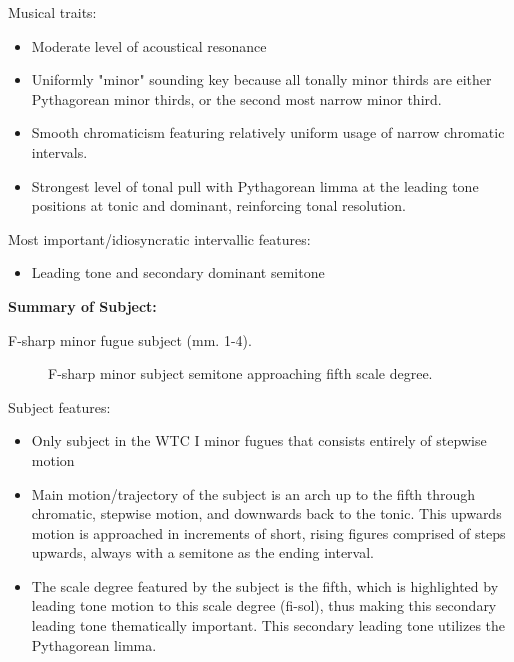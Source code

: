 Musical traits:

\begin{itemize}
\tightlist
\item
  Moderate level of acoustical resonance
\item
  Uniformly "minor" sounding key because all tonally minor thirds are
  either Pythagorean minor thirds, or the second most narrow minor
  third.
\item
  Smooth chromaticism featuring relatively uniform usage of narrow
  chromatic intervals.
\item
  Strongest level of tonal pull with Pythagorean limma at the leading
  tone positions at tonic and dominant, reinforcing tonal resolution.
\end{itemize}

Most important/idiosyncratic intervallic features:

\begin{itemize}
\tightlist
\item
  Leading tone and secondary dominant semitone
\end{itemize}

\textbf{Summary of Subject:}



\begin{Example}[H]
\vspace{1.5em}
    \centering
    \caption{ F-sharp minor fugue subject (mm. 1-4). }
\end{Example}    



\begin{figure}[H]
\vspace{1.5em}
    \centering
    \caption{F-sharp minor subject semitone approaching fifth scale degree. }
\end{figure}    Subject features:

\begin{itemize}
\tightlist
\item
  Only subject in the WTC I minor fugues that consists entirely of
  stepwise motion
\item
  Main motion/trajectory of the subject is an arch up to the fifth
  through chromatic, stepwise motion, and downwards back to the tonic.
  This upwards motion is approached in increments of short, rising
  figures comprised of steps upwards, always with a semitone as the
  ending interval.
\item
  The scale degree featured by the subject is the fifth, which is
  highlighted by leading tone motion to this scale degree (fi-sol), thus
  making this secondary leading tone thematically important. This
  secondary leading tone utilizes the Pythagorean limma.
\end{itemize}

